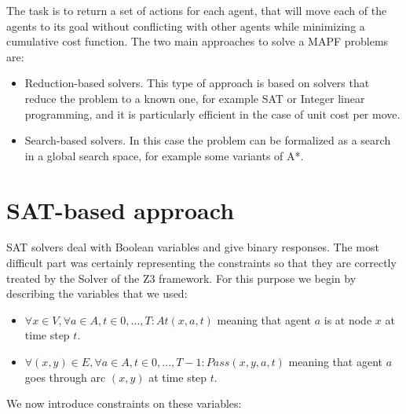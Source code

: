 \documentclass[12pt, a4paper, hidelinks]{article}
\begin{document}
The task is to return a set of actions for each agent, that will move each of the agents to its goal without conflicting with other agents while minimizing a cumulative cost function. The two main approaches to solve a MAPF problems are:

\begin{itemize}
\item Reduction-based solvers. This type of approach is based on solvers that reduce the problem to a known one, for example SAT or Integer linear programming, and it is particularly efficient in the case of unit cost per move. 
\item Search-based solvers. In this case the problem can be formalized as a search in a global search space, for example some variants of A*.
\end{itemize}

\section{SAT-based approach}
SAT solvers deal with Boolean variables and give binary responses. The most difficult part was certainly representing the constraints so that they are correctly treated by the Solver of the Z3 framework. For this purpose we begin by describing the variables that we used:

\begin{itemize}
\item $\forall x \in V, \forall a \in A, t \in {0, ..., T} : At(x, a, t)$ meaning that agent $a$ is at node $x$ at time step $t$.
\item $\forall(x, y)\in E, \forall a \in A, t \in {0, ..., T-1} : Pass(x, y, a, t)$ meaning that agent $a$ goes through arc $(x, y)$ at time step $t$. 
\end{itemize}

We now introduce constraints on these variables:
\end{document}
